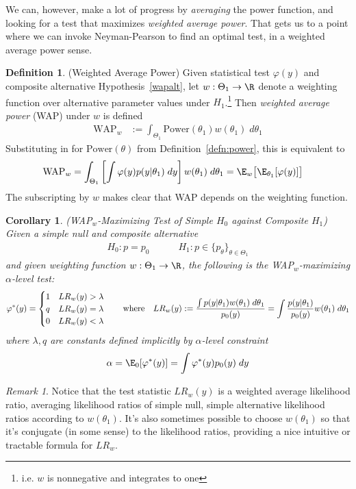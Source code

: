 \documentclass[12pt]{article}
\theoremstyle{plain}
\newtheorem{cor}[thm]{Corollary}
\theoremstyle{definition}
\newtheorem{defn}[thm]{Definition}
\theoremstyle{remark}
\newtheorem*{rmk}{Remark}
\newcommand{\ra}{\rightarrow}
\begin{document}
We can, however, make a lot of progress by \emph{averaging} the power
function, and looking for a test that maximizes
\emph{weighted average power}.
That gets us to a point where we can invoke Neyman-Pearson to find an
optimal test, in a weighted average power sense.

\begin{defn}(Weighted Average Power)
\label{defn:wap}
Given statistical test $\varphi(y)$ and composite alternative
Hypothesis~\ref{wapalt}, let $w:\Theta_1 \ra \R$ denote a weighting
function over alternative parameter values under $H_1$.\footnote{%
  i.e.  $w$ is nonnegative and integrates to one
}
Then \emph{weighted average power} (WAP) under $w$ is defined
\begin{align*}
  \text{WAP}_w
  &:=
  \int_{\Theta_1}
  \text{Power}(\theta_1)
  w(\theta_1)\;d\theta_1
\end{align*}
Substituting in for $\text{Power}(\theta)$ from
Definition~\ref{defn:power}, this is equivalent to
\begin{align*}
  \text{WAP}_w
  &=
  \int_{\Theta_1}
  \left[
    \int
    \varphi(y)
    p(y|\theta_1)
    \;dy
  \right]
  w(\theta_1)\;d\theta_1
  =
  \E_w\big[
    \E_{\theta_1}[\varphi(y)]
  \big]
\end{align*}
The subscripting by $w$ makes clear that WAP depends on the weighting
function.
\end{defn}

\begin{cor}
\emph{(WAP${}_w$-Maximizing Test of Simple $H_0$ against Composite $H_1$)}
Given a simple null and composite alternative
\begin{align*}
  H_0:p=p_0
  \qquad\quad
  H_1:p\in\{p_\theta\}_{\theta\in\Theta_1}
\end{align*}
and given weighting function $w:\Theta_1\ra\R$, the following is the
WAP${}_w$-maximizing $\alpha$-level test:
\begin{align*}
  \varphi^*(y)
  =
  \begin{cases}
    1 & LR_w(y) > \lambda \\
    q & LR_w(y) = \lambda \\
    0 & LR_w(y) < \lambda
  \end{cases}
  \qquad \text{where}\quad
  LR_w(y) :=
  \frac{%
    \int p(y|\theta_1)w(\theta_1)\; d\theta_1
  }{p_0(y)}
  =
  \int
  \frac{p(y|\theta_1)}{p_0(y)}
  w(\theta_1)\; d\theta_1
\end{align*}
where $\lambda,q$ are constants defined implicitly by $\alpha$-level
constraint
\begin{align}
  \alpha
  = \E_0[\varphi^*(y)]
  = \int \varphi^*(y) p_0(y)\; dy
\end{align}
\end{cor}
\begin{rmk}
Notice that the test statistic $LR_w(y)$ is a weighted average
likelihood ratio, averaging likelihood ratios of simple null, simple
alternative likelihood ratios according to $w(\theta_1)$.
It's also sometimes possible to choose $w(\theta_1)$ so that it's
conjugate (in some sense) to the likelihood ratios, providing a nice
intuitive or tractable formula for $LR_w$.
\end{rmk}
\end{document}
